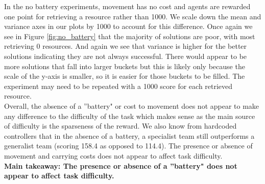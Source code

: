 \documentclass[12pt]{article}
\begin{document}
\begin{appendices}
In the no battery experiments, movement has no cost and agents are rewarded one point for retrieving a resource rather than 1000. We scale down the mean and variance axes in our plots by 1000 to account for this difference. Once again we see in Figure \ref{fig:no_battery} that the majority of solutions are poor, with most retrieving 0 resources. And again we see that variance is higher for the better solutions indicating they are not always successful. There would appear to be more solutions that fall into larger buckets but this is likely only because the scale of the y-axis is smaller, so it is easier for those buckets to be filled. The experiment may need to be repeated with a 1000 score for each retrieved resource.\\

Overall, the absence of a ''battery" or cost to movement does not appear to make any difference to the difficulty of the task which makes sense as the main source of difficulty is the sparseness of the reward. We also know from hardcoded controllers that in the absence of a battery, a specialist team still outperforms a generalist team (scoring 158.4 as opposed to 114.4). The presence or absence of movement and carrying costs does not appear to affect task difficulty.\\

\textbf{Main takeaway: The presence or absence of a ''battery" does not appear to affect task difficulty.}

\begin{figure}[!tbp]
  \centering
  \hfill
  \hfill
  

\end{figure}
\end{appendices}
\end{document}
